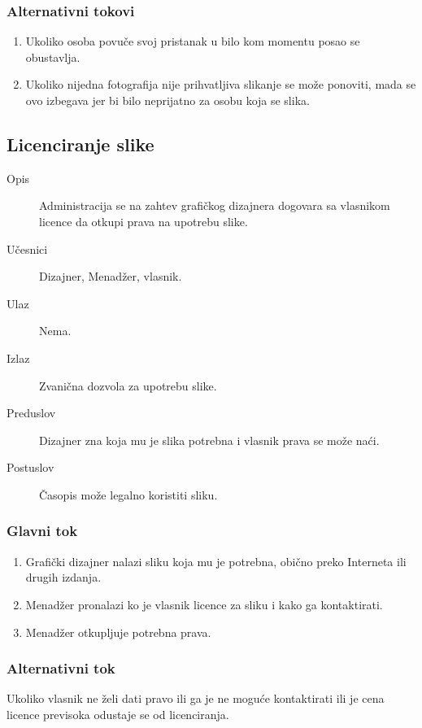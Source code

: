 \subsubsection{Alternativni tokovi}
\begin{enumerate} 
\item Ukoliko osoba povuče svoj pristanak u bilo kom momentu posao se obustavlja.
\item Ukoliko nijedna fotografija nije prihvatljiva slikanje se može ponoviti, mada se ovo izbegava jer bi bilo neprijatno za osobu koja se slika.
\end{enumerate}

\subsection{Licenciranje slike}
\begin{description}
\item [Opis] Administracija se na zahtev grafičkog dizajnera dogovara sa vlasnikom licence da otkupi prava na upotrebu slike.
\item [Učesnici] Dizajner, Menadžer, vlasnik.
\item [Ulaz] Nema.
\item [Izlaz] Zvanična dozvola za upotrebu slike.
\item [Preduslov] Dizajner zna koja mu je slika potrebna i vlasnik prava se može naći.
\item [Postuslov] Časopis može legalno koristiti sliku.
\end{description}
\subsubsection{Glavni tok}
\begin{enumerate} 
\item Grafički dizajner nalazi sliku koja mu je potrebna, obično preko Interneta ili drugih izdanja.
\item Menadžer pronalazi ko je vlasnik licence za sliku i kako ga kontaktirati.
\item Menadžer otkupljuje potrebna prava.
\end{enumerate}
\subsubsection{Alternativni tok}
Ukoliko vlasnik ne želi dati pravo ili ga je ne moguće kontaktirati ili je cena licence previsoka odustaje se od licenciranja.